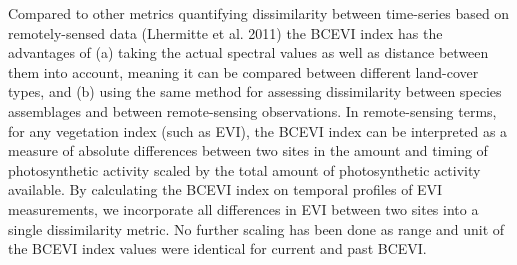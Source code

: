 {	Compared to other metrics quantifying dissimilarity between time-series based on remotely-sensed data (Lhermitte et al. 2011) the BCEVI index has the advantages of (a) taking the actual spectral values as well as distance between them into account, meaning it can be compared between different land-cover types, and (b) using the same method for assessing dissimilarity between species assemblages and between remote-sensing observations. In remote-sensing terms, for any vegetation index (such as EVI), the BCEVI index can be interpreted as a measure of absolute differences between two sites in the amount and timing of photosynthetic activity scaled by the total amount of photosynthetic activity available. By calculating the BCEVI index on temporal profiles of EVI measurements, we incorporate all differences in EVI between two sites into a single dissimilarity metric. No further scaling has been done as range and unit of the BCEVI index values were identical for current and past BCEVI.

}
